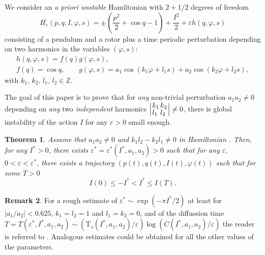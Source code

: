 \documentclass[a4paper,10pt]{article}
\newcommand{\T}{\text{T}}
\newtheorem{theorem}{Theorem}
\theoremstyle{definition}
\newtheorem{remark}[theorem]{Remark}
\begin{document}
We consider an \emph{a priori unstable} Hamiltonian with $2+1/2$ degrees of freedom
\begin{equation}
H_{\varepsilon}(p , q , I , \varphi , s) = \pm\left( \frac{p^2}{2} + \cos q  -1 \right) + \frac{I^2}{2} + \varepsilon h(q,\varphi,s)
\label{eq:hamil_system}
\end{equation}
consisting of a pendulum and a rotor plus a time periodic perturbation depending on two harmonics in the variables $(\varphi,s)$:
\begin{equation}
\begin{gathered}
h(q,\varphi,s)=f(q)g(\varphi, s),\\
f(q) = \cos q, \qquad g(\varphi , s) = a_1 \cos(k_1\varphi + l_1 s) + a_2\cos(k_2\varphi + l_2 s),\label{eq:g_general_case}
\end{gathered}
\end{equation}
with $k_1,\,k_2,\, l_1,\,l_2\in\mathbb{Z}$.

The goal of this paper is to prove that for \emph{any} non-trivial perturbation $a_1a_2 \neq 0$ depending on \emph{any} two \emph{independent} harmonics
$\arraycolsep=0.8pt\def\arraystretch{0.8}\left|\begin{array}{ll}k_1 & k_2 \\ l_1 & l_2\end{array}\right|\neq 0$,
there is global instability of the action $I$ for any $\varepsilon>0$ small enough.
\begin{theorem}\label{theo:main_theo}
Assume that $a_1a_2\neq 0$ and $k_1 l_2-k_2 l_1\neq 0$ in Hamiltonian \text{\eqref{eq:hamil_system}-\eqref{eq:g_general_case}}.
Then, for any $I^* > 0$, there exists $\varepsilon^* = \varepsilon^*(I^*, a_1, a_2)>0$ such that for any $\varepsilon$, $0<\varepsilon<\varepsilon^*$,
there exists a trajectory $\left(p(t),q(t),I(t), \varphi(t)\right)$ such that for some $T>0$
\begin{equation*}
I(0)\leq - I^*<I^*\leq I(T).
\end{equation*}
\end{theorem}

\begin{remark}
For a rough estimate of $\varepsilon^* \sim \exp( - \pi I^* /2 ) $ at least for $\left|a_1/a_2\right| < 0.625$, $k_1 = l_2 = 1$ and $l_1 = k_2 = 0$, and of the diffussion time $T = T(\varepsilon^* , I^* , a_1 , a_2) \sim (\T_s(I^* , a_1 , a_2)/\varepsilon)\log( C(I^* , a_1 , a_2) /\varepsilon)$ the reader is referred to \cite{Delshams2017}.
Analogous estimates could be obtained for all the other values of the parameters. 
\end{remark}
\end{document}
